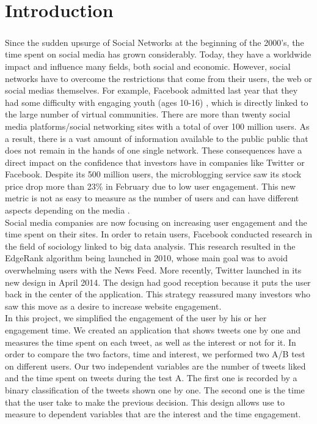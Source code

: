 \chapter*{Introduction}

\paragraph{}
Since the sudden upsurge of Social Networks at the beginning of the 2000's, the time spent on social media has grown considerably. Today, they have a worldwide impact and  influence many fields, both social and economic. However, social networks have to overcome the restrictions that come from their users, the web or social medias themselves. For example, Facebook admitted last year that they had some difficulty with engaging youth (ages 10-16) \cite{f_youth_engagement}, which is directly linked to the large number of virtual communities. There are more than twenty social media platforms/social networking sites with a total of over 100 million users. As a result, there is a vast amount of information available to the public public that does not remain in the hands of one single network. These consequences have a direct impact on the confidence that investors have in companies like Twitter or Facebook. Despite its 500 million users, the microblogging service saw its stock price drop more than 23\% \cite{t_stocks} in February due to low user engagement. This new metric is not as easy to measure as the number of users and can have different aspects depending on the media \cite{s_engag_measure}. \\
Social media companies are now focusing on increasing user engagement and the time spent on their sites. In order to retain users, Facebook conducted research in the field of sociology linked to big data analysis. This research resulted in the EdgeRank algorithm being launched in 2010, whose main goal was to avoid overwhelming users with the News Feed. More recently, Twitter launched in its new design in April 2014. The design had good reception because it puts the user back in the center of the application. This strategy reassured many investors who saw this move as a desire to increase website engagement.\\
In this project, we simplified the engagement of the user by his or her engagement time. We created an application  that shows tweets one by one and measures the time spent on each tweet, as well as the interest or not for it. In order to compare the two factors, time and interest, we performed two A/B test on different users. Our two independent variables are the number of tweets liked and the time spent on tweets during the test A. The first one is recorded by a binary classification of the tweets shown one by one. The second one is the time that the user take to make the previous decision. This design allows use to measure to dependent variables that are the interest and the time engagement. \\
